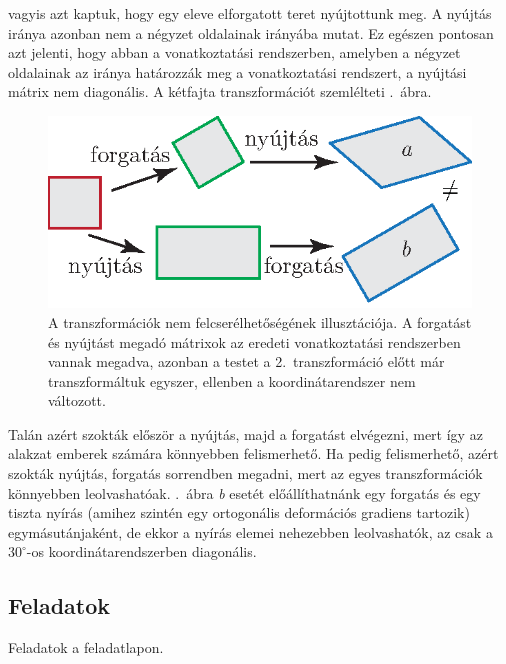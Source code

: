 \documentclass[12pt,a4paper]{scrartcl}
\begin{document}
vagyis azt kaptuk, hogy egy eleve elforgatott teret nyújtottunk meg. A nyújtás iránya azonban nem a négyzet oldalainak irányába mutat. Ez egészen pontosan azt jelenti, hogy abban a vonatkoztatási rendszerben, amelyben a négyzet oldalainak az iránya határozzák meg a vonatkoztatási rendszert, a nyújtási mátrix nem diagonális. A kétfajta transzformációt szemlélteti .\ ábra.

\begin{figure}[htb] 
\centering    
\includegraphics[scale=1]{figs/nem_kommutativ.eps}
\caption[Nem kommutatív transzformációk]{A transzformációk nem felcserélhetőségének illusztációja. A forgatást és nyújtást megadó mátrixok az eredeti vonatkoztatási rendszerben vannak megadva, azonban a testet a 2.\ transzformáció előtt már transzformáltuk egyszer, ellenben a koordinátarendszer nem változott.}
\label{fig:nem_kommutativ}
\end{figure}

Talán azért szokták először a nyújtás, majd a forgatást elvégezni, mert így az alakzat emberek számára könnyebben felismerhető. Ha pedig felismerhető, azért szokták nyújtás, forgatás sorrendben megadni, mert az egyes transzformációk könnyebben leolvashatóak. .\ ábra \textit{b} esetét előállíthatnánk egy forgatás és egy tiszta nyírás (amihez szintén egy ortogonális deformációs gradiens tartozik) egymásutánjaként, de ekkor a nyírás elemei nehezebben leolvashatók, az csak a $30^\circ$-os koordinátarendszerben diagonális.

\subsection{Feladatok}
Feladatok a feladatlapon.
\end{document}
